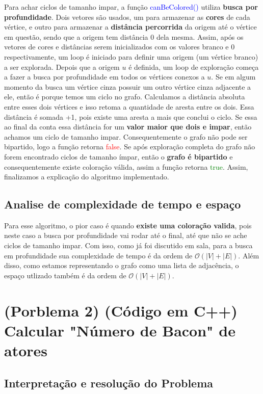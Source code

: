 \documentclass[12pt,a4paper, brazil]{article}
\newcommand{\B}[1]{\textbf{#1}}
\newcommand{\azul}[1]{\textcolor{blue}{#1}}
\newcommand{\vermelho}[1]{\textcolor{red}{#1}}
\newcommand{\verde}[1]{\textcolor{green}{#1}}
\begin{document}
Para achar ciclos de tamanho impar, a função \azul{canBeColored()} utiliza \B{busca por profundidade}. Dois vetores são usados, um para armazenar as \B{cores} de cada vértice, e outro para armazenar a \B{distância percorrida} da origem até o vértice em questão, sendo que a origem tem distância 0 dela mesma. Assim, após os vetores de cores e distâncias serem inicializados com os valores branco e 0 respectivamente, um loop é iniciado para definir uma origem (um vértice branco) a ser explorada. Depois que a origem $u$ é definida, um loop de exploração começa a fazer a busca por profundidade em todos os vértices conexos a $u$. Se em algum momento da busca um vértice cinza possuir um outro vértice cinza adjacente a ele, então é porque temos um ciclo no grafo. Calculamos a distância absoluta entre esses dois vértices e isso retoma a quantidade de aresta entre os dois. Essa distância é somada +1, pois existe uma aresta a mais que conclui o ciclo. Se essa ao final da conta essa distância for um \B{valor maior que dois e impar}, então achamos um ciclo de tamanho impar. Consequentemente o grafo não pode ser bipartido, logo a função retorna \vermelho{false}. Se após exploração completa do grafo não forem encontrado ciclos de tamanho ímpar, então o \B{grafo é bipartido} e consequentemente existe coloração válida, assim a função retorna \verde{true}. Assim, finalizamos a explicação do algoritmo implementado.

\subsection{Analise de complexidade de tempo e espaço}

Para esse algoritmo, o pior caso é quando \B{existe uma coloração valida}, pois neste caso a busca por profundidade vai rodar até o final, até que não se ache ciclos de tamanho impar. Com isso, como já foi discutido em sala, para a busca em profundidade sua complexidade de tempo é da ordem de $\mathcal{O}(|V|+|E|)$. Além disso, como estamos representando o grafo como uma lista de adjacência, o espaço utlizado também é da ordem de $\mathcal{O}(|V|+|E|)$.
\section{(Porblema 2) (Código em C++) Calcular "Número de Bacon" de atores}

\subsection{Interpretação e resolução do Problema}
\end{document}
